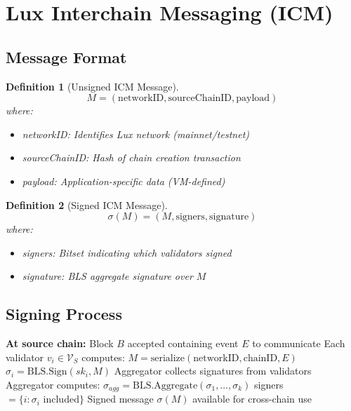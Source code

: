 \documentclass[11pt,a4paper]{article}
\newtheorem{definition}{Definition}
\begin{document}
\section{Lux Interchain Messaging (ICM)}

\subsection{Message Format}

\begin{definition}[Unsigned ICM Message]
\begin{equation}
M = (\text{networkID}, \text{sourceChainID}, \text{payload})
\end{equation}
where:
\begin{itemize}
    \item networkID: Identifies Lux network (mainnet/testnet)
    \item sourceChainID: Hash of chain creation transaction
    \item payload: Application-specific data (VM-defined)
\end{itemize}
\end{definition}

\begin{definition}[Signed ICM Message]
\begin{equation}
\sigma(M) = (M, \text{signers}, \text{signature})
\end{equation}
where:
\begin{itemize}
    \item signers: Bitset indicating which validators signed
    \item signature: BLS aggregate signature over $M$
\end{itemize}
\end{definition}

\subsection{Signing Process}

\begin{algorithm}
\caption{ICM Message Signing}
\begin{algorithmic}[1]
\STATE \textbf{At source chain:}
\STATE Block $B$ accepted containing event $E$ to communicate
\STATE Each validator $v_i \in \mathcal{V}_S$ computes:
    \STATE \quad $M = \text{serialize}(\text{networkID}, \text{chainID}, E)$
    \STATE \quad $\sigma_i = \text{BLS.Sign}(sk_i, M)$
\STATE Aggregator collects signatures from validators
\STATE Aggregator computes:
    \STATE \quad $\sigma_{agg} = \text{BLS.Aggregate}(\sigma_1, \ldots, \sigma_k)$
    \STATE \quad signers $= \{i : \sigma_i \text{ included}\}$
\STATE Signed message $\sigma(M)$ available for cross-chain use
\end{algorithmic}
\end{algorithm}
\end{document}
